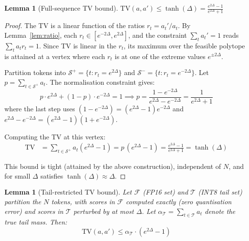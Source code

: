 \documentclass[11pt,a4paper]{article}
\newtheorem{lemma}[theorem]{Lemma}
\theoremstyle{definition}
\theoremstyle{remark}
\begin{document}
\begin{lemma}[Full-sequence TV bound]
\label{lem:tv}
$\displaystyle \mathrm{TV}(a, a') \leq \tanh(\Delta) = \frac{e^{2\Delta} - 1}{e^{2\Delta} + 1}$
\end{lemma}

\begin{proof}
The TV is a linear function of the ratios $r_t = a_t'/a_t$.  By Lemma~\ref{lem:ratio}, each $r_t \in [e^{-2\Delta}, e^{2\Delta}]$, and the constraint $\sum_t a_t' = 1$ reads $\sum_t a_t r_t = 1$.  Since TV is linear in the $r_t$, its maximum over the feasible polytope is attained at a vertex where each $r_t$ is at one of the extreme values $e^{\pm 2\Delta}$.

Partition tokens into $\mathcal{S}^+ = \{t : r_t = e^{2\Delta}\}$ and $\mathcal{S}^- = \{t : r_t = e^{-2\Delta}\}$.  Let $p = \sum_{t \in \mathcal{S}^+} a_t$.  The normalisation constraint gives:
\[
  p \cdot e^{2\Delta} + (1-p) \cdot e^{-2\Delta} = 1 \implies p = \frac{1 - e^{-2\Delta}}{e^{2\Delta} - e^{-2\Delta}} = \frac{1}{e^{2\Delta} + 1}
\]
where the last step uses $(1 - e^{-2\Delta}) = (e^{2\Delta}-1)e^{-2\Delta}$ and $e^{2\Delta} - e^{-2\Delta} = (e^{2\Delta}-1)(1+e^{-2\Delta})$.

Computing the TV at this vertex:
\begin{align*}
  \mathrm{TV} &= \sum_{t \in \mathcal{S}^+} a_t(e^{2\Delta} - 1) = p\,(e^{2\Delta} - 1) = \frac{e^{2\Delta} - 1}{e^{2\Delta} + 1} = \tanh(\Delta)
\end{align*}

This bound is tight (attained by the above construction), independent of $N$, and for small $\Delta$ satisfies $\tanh(\Delta) \approx \Delta$.
\end{proof}

\begin{lemma}[Tail-restricted TV bound]
\label{lem:tail_tv}
Let $\mathcal{F}$ (FP16 set) and $\mathcal{T}$ (INT8 tail set) partition the $N$ tokens, with scores in $\mathcal{F}$ computed exactly (zero quantisation error) and scores in $\mathcal{T}$ perturbed by at most $\Delta$.  Let $\alpha_{\mathcal{T}} = \sum_{t \in \mathcal{T}} a_t$ denote the true tail mass.  Then:
\[
  \mathrm{TV}(a, a') \leq \alpha_{\mathcal{T}} \cdot (e^{2\Delta} - 1)
\]
\end{lemma}
\end{document}
